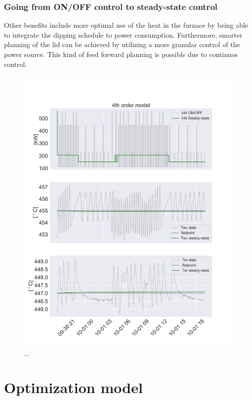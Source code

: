 \documentclass[lettersize,journal]{IEEEtran}
\begin{document}
\subsubsection{Going from ON/OFF control to steady-state control}

Other benefits include more optimal use of the heat in the furnace by being able to integrate the dipping schedule to power consumption. Furthermore, smarter planning of the lid can be achieved by utilizing a more granular control of the power source. This kind of feed forward planning is possible due to continuos control.

\begin{figure}[!t]
    \centering
    \includegraphics[width=\columnwidth]{figures/4thOrderModelVisualization.png}
    \caption{...}
    \label{fig:4thOrderModelVisualization}
\end{figure}

\section{Optimization model}
\end{document}
